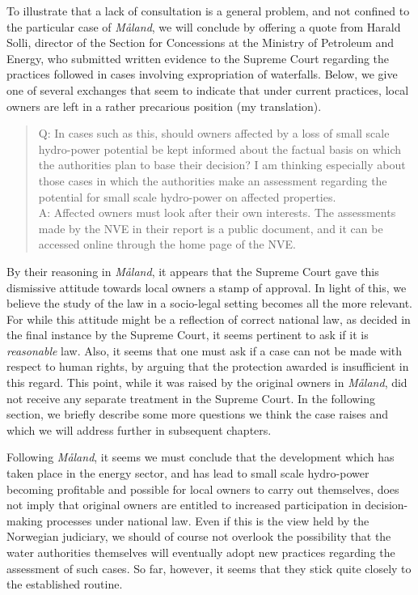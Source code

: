 To illustrate that a lack of consultation is a general problem, and not confined to the particular case of \emph{Måland}, we will conclude by offering a quote from Harald Solli, director of the Section for Concessions at the Ministry of Petroleum and Energy, who submitted written evidence to the Supreme Court regarding the practices followed in cases involving expropriation of waterfalls. Below, we give one of several exchanges that seem to indicate that under current practices, local owners are left in a rather precarious position (my translation).

\begin{quote}
Q: In cases such as this, should owners affected by a loss of small scale hydro-power potential be kept informed about the factual basis on which the authorities plan to base their decision? I am thinking especially about those cases in which the authorities make an assessment regarding the potential for small scale hydro-power on affected properties. \\
A: Affected owners must look after their own interests. The assessments made by the NVE in their report is a public document, and it can be accessed online through the home page of the NVE.
\end{quote}

By their reasoning in \emph{Måland}, it appears that the Supreme Court gave this dismissive attitude towards local owners a stamp of approval. In light of this, we believe the study of the law in a socio-legal setting becomes all the more relevant. For while this attitude might be a reflection of correct national law, as decided in the final instance by the Supreme Court, it seems pertinent to ask if it is \emph{reasonable} law. Also, it seems that one must ask if a case can not be made with respect to human rights, by arguing that the protection awarded is insufficient in this regard. This point, while it was raised by the original owners in \emph{Måland}, did not receive any separate treatment in the Supreme Court. In the following section, we briefly describe some more questions we think the case raises and which we will address further in subsequent chapters.

Following \emph{Måland}, it seems we must conclude that the development which has taken place in the energy sector, and has lead to small scale hydro-power becoming profitable and possible for local owners to carry out themselves, does not imply that original owners are entitled to increased participation in decision-making processes under national law. Even if this is the view held by the Norwegian judiciary, we should of course not overlook the possibility that the water authorities themselves will eventually adopt new practices regarding the assessment of such cases. So far, however, it seems that they stick quite closely to the established routine. 

